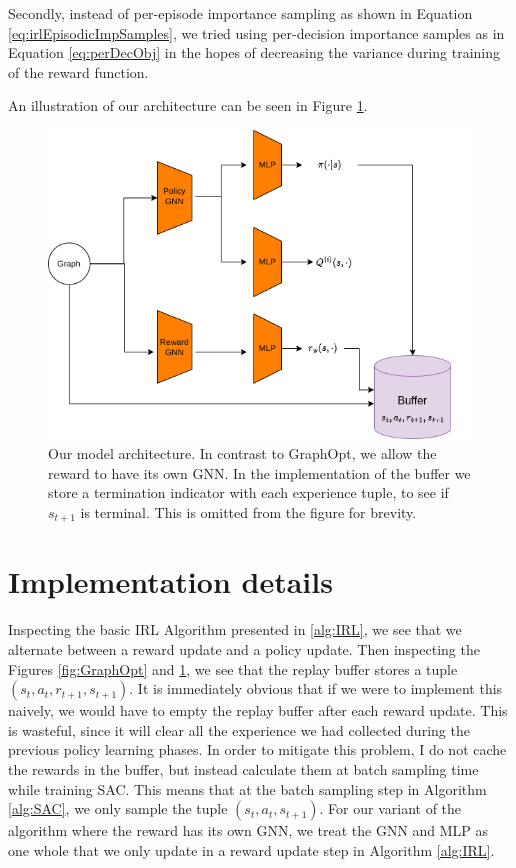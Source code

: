 \documentclass{report}
\numberwithin{equation}{section}
\numberwithin{figure}{section}
\numberwithin{table}{section}
\numberwithin{algorithm}{section}
\begin{document}
Secondly, instead of per-episode importance sampling as 
shown in Equation \ref{eq:irlEpisodicImpSamples}, we tried 
using per-decision importance samples as in 
Equation \ref{eq:perDecObj} in the hopes of decreasing the 
variance during training of the reward function.

An illustration of our architecture can be seen in 
Figure \ref{fig:OurModel}.

\begin{figure}[H]
  \begin{center}
    \includegraphics[scale=0.5]{my_model_architecture.png}
    \caption{\label{fig:OurModel} Our model architecture. In contrast 
    to GraphOpt, we allow the reward to have its own GNN. 
    In the implementation of the buffer we store a 
    termination indicator with 
    each experience tuple, to see if $s_{t+1}$ is terminal. 
    This is omitted from the figure for brevity.}
  \end{center}
\end{figure}


\section{Implementation details}
Inspecting the basic IRL Algorithm presented in \ref{alg:IRL}, 
we see that we alternate between a reward update and a policy 
update. Then inspecting the Figures \ref{fig:GraphOpt} and 
\ref{fig:OurModel}, we see that the replay buffer stores 
a tuple $(s_t, a_t, r_{t+1}, s_{t+1})$. It is immediately 
obvious that if we were to implement this naively, we would 
have to empty the replay buffer after each reward update. 
This is wasteful, since it will clear all the experience 
we had collected during the previous policy learning 
phases. In order to mitigate this problem, I do not 
cache the rewards in the buffer, but instead calculate 
them at batch sampling time while training SAC. 
This means that at the batch sampling step in Algorithm 
\ref{alg:SAC}, we only sample the tuple $(s_t, a_t, s_{t+1})$.
For our variant of the algorithm where the reward has its own 
GNN, we treat the GNN and MLP as one whole that we only update 
in a reward update step in Algorithm \ref{alg:IRL}. 
\end{document}

